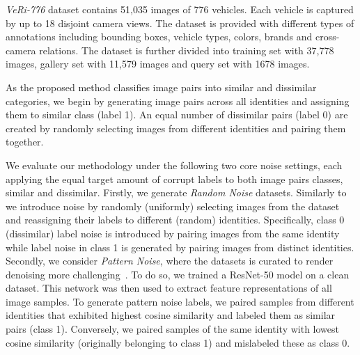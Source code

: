 \documentclass[lettersize,journal]{IEEEtran}
\begin{document}
\textit{VeRi-776} dataset contains 51,035 images of 776 vehicles. Each vehicle is captured by up to 18 disjoint camera views. The dataset is provided with different types of annotations including bounding boxes, vehicle types, colors, brands and cross-camera relations. The dataset is further divided into training set with 37,778 images, gallery set with 11,579 images and query set with 1678 images.

As the proposed method classifies image pairs into similar and dissimilar categories, we begin by generating image pairs across all identities and assigning them to similar class (label 1). An equal number of dissimilar pairs (label 0) are created by randomly selecting images from different identities and pairing them together.

\vskip 0.15cm
We evaluate our methodology under the following two core noise settings, each applying the equal target amount of corrupt labels to both image pairs classes, similar and dissimilar. 
Firstly, we generate {\it Random Noise} datasets. Similarly to~\cite{19,20,23} we introduce noise by randomly (uniformly) selecting images from the dataset and reassigning their labels to different (random) identities. Specifically, class 0 (dissimilar) label noise is introduced by pairing images from the same identity while label noise in class 1 is generated by pairing images from distinct identities.
Secondly, we consider {\it Pattern Noise}, where the datasets is curated to render denoising more challenging~\cite{21,23}. To do so, we trained a ResNet-50 model on a clean dataset. This network was then used to extract feature representations of all image samples. To generate pattern noise labels, we paired samples from different identities that exhibited highest cosine similarity and labeled them as similar pairs (class 1). Conversely, we paired samples of the same identity with lowest cosine similarity (originally belonging to class 1) and mislabeled these as class 0.
\end{document}
